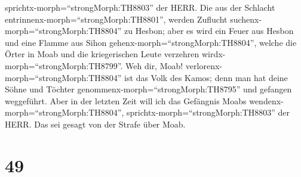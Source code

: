 sprichtx-morph=``strongMorph:TH8803'' der HERR.  Die aus
der Schlacht entrinnenx-morph=``strongMorph:TH8801'', werden Zuflucht
suchenx-morph=``strongMorph:TH8804'' zu Hesbon; aber es wird ein Feuer
aus Hesbon und eine Flamme aus Sihon
gehenx-morph=``strongMorph:TH8804'', welche die Örter in Moab und die
kriegerischen Leute verzehren wirdx-morph=``strongMorph:TH8799''.
 Weh dir, Moab! verlorenx-morph=``strongMorph:TH8804'' ist
das Volk des Kamos; denn man hat deine Söhne und Töchter
genommenx-morph=``strongMorph:TH8795'' und gefangen weggeführt.
 Aber in der letzten Zeit will ich das Gefängnis Moabs
wendenx-morph=``strongMorph:TH8804'',
sprichtx-morph=``strongMorph:TH8803'' der HERR. Das sei gesagt von der
Strafe über Moab.

\hypertarget{section-48}{%
\section{49}\label{section-48}}

